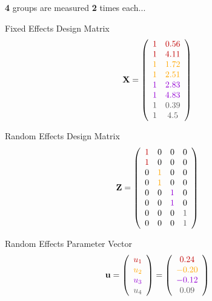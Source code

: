 \documentclass{beamer}
\begin{document}
\begin{frame}[fragile]
\begin{columns}
\begin{column}{0.5\textwidth}
        \end{column}
    \end{columns}
    \vspace{0.3cm}
    
    \textbf{4} groups are measured \textbf{2} times each...
\end{frame}

\begin{frame}{Fixed Effects Design Matrix}
\[
\mathbf{X} = \left( 
\begin{array}{cc} 
\color{darkred}{1} & \color{darkred}{0.56} \\ 
\color{darkred}{1} & \color{darkred}{4.11} \\ 
\color{orange}{1} & \color{orange}{1.72} \\ 
\color{orange}{1} & \color{orange}{2.51} \\ 
\color{violet}{1} & \color{violet}{2.83} \\ 
\color{violet}{1} & \color{violet}{4.83} \\ 
\color{darkgray}{1} & \color{darkgray}{0.39} \\ 
\color{darkgray}{1} & \color{darkgray}{4.5} 
\end{array}\right)
\]
\end{frame}

\begin{frame}{Random Effects Design Matrix}
\[
\mathbf{Z} = \left( 
\begin{array}{cccc} 
\color{darkred}{1} & 0 & 0 & 0 \\ 
\color{darkred}{1} & 0 & 0 & 0 \\ 
0 & \color{orange}{1} & 0 & 0 \\ 
0 & \color{orange}{1} & 0 & 0 \\ 
0 & 0 & \color{violet}{1} & 0 \\ 
0 & 0 & \color{violet}{1} & 0 \\ 
0 & 0 & 0 & \color{darkgray}{1} \\ 
0 & 0 & 0 & \color{darkgray}{1} 
\end{array}\right)
\]
\end{frame}

\begin{frame}{Random Effects Parameter Vector}
\[
\mathbf{u} = \left( 
\begin{array}{c} 
\color{darkred}{u_1} \\ 
\color{orange}{u_2} \\ 
\color{violet}{u_3} \\ 
\color{darkgray}{u_4} 
\end{array}\right) = \left( 
\begin{array}{c} 
\color{darkred}{0.24} \\ 
\color{orange}{-0.20} \\ 
\color{violet}{-0.12} \\ 
\color{darkgray}{0.09} 
\end{array}\right)
\]
\end{frame}
\end{document}
